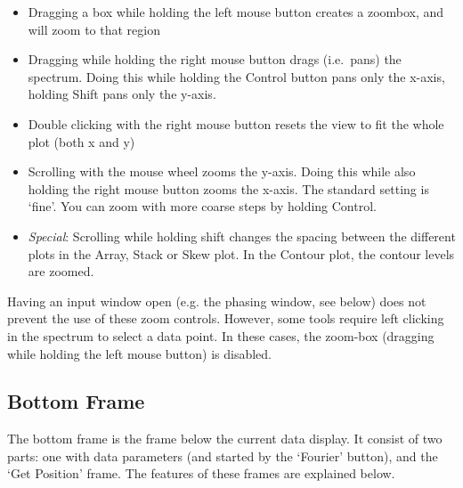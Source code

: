 \documentclass[11pt,a4paper]{article}
\begin{document}
\begin{itemize}
\item Dragging a box while holding the left mouse button creates a zoombox, and will zoom to that region
\item Dragging while holding the right mouse button drags (i.e.\ pans) the spectrum. Doing this while holding the Control button pans only the x-axis, holding Shift pans only the y-axis.
\item Double clicking with the right mouse button resets the view to fit the whole plot (both x and y)
\item Scrolling with the mouse wheel zooms the y-axis. Doing this while also holding the right mouse button zooms the x-axis. The standard setting is `fine'. You can zoom with more coarse steps by holding Control.
\item \textit{Special}: Scrolling while holding shift changes the spacing between the different plots in the Array, Stack or Skew plot. In the Contour plot, the contour levels are zoomed.
\end{itemize}

Having an input window open (e.g. the phasing window, see below) does not prevent the use of these zoom controls. However, some tools require left clicking in the spectrum to select a data point. In these cases, the zoom-box (dragging while holding the left mouse button) is disabled.

\subsection{Bottom Frame}
The bottom frame is the frame below the current data display. It consist of two parts: one with data parameters (and started by the `Fourier' button), and the `Get Position' frame. The features of these frames are explained below.
\end{document}
